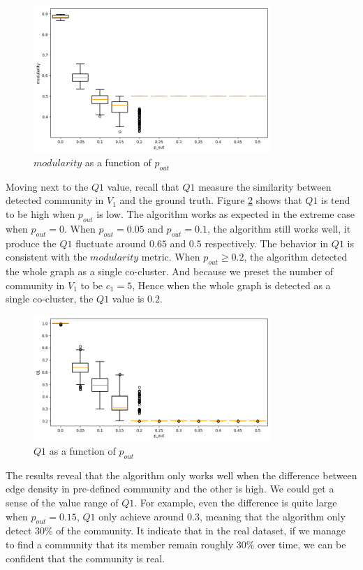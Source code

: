 \begin{figure}[H]
	\centering
	\includegraphics[width=0.8\textwidth]{images/modularity_pout.png}
	\caption{$modularity$ as a function of $p_{out}$ }
	\label{fig:modularity_pout}
\end{figure}

Moving next to the $Q1$ value, recall that $Q1$ measure the similarity between detected community in $V_1$ and the ground truth.
Figure \ref{fig:Q1_pout} shows that $Q1$ is tend to be high when $p_{out}$ is low.
The algorithm works as expected in the extreme case when $p_{out} = 0$.
When $p_{out} = 0.05$ and $p_{out} = 0.1$, the algorithm still works well, it produce the $Q1$ fluctuate around $0.65$ and $0.5$ respectively.
The behavior in $Q1$ is consistent with the $modularity$ metric.
When $p_{out} \ge 0.2$, the algorithm detected the whole graph as a single co-cluster.
And because we preset the number of community in $V_1$ to be $c_1=5$,
Hence when the whole graph is detected as a single co-cluster, the $Q1$ value is $0.2$.

\begin{figure}[H]
	\centering
	\includegraphics[width=0.8\textwidth]{images/Q1_pout.png}
	\caption{$Q1$ as a function of $p_{out}$ }
	\label{fig:Q1_pout}
\end{figure}

The results reveal that the algorithm only works well when the difference between edge density in pre-defined community and the other is high.
We could get a sense of the value range of $Q1$.
For example, even the difference is quite large when $p_{out}=0.15$,
$Q1$ only achieve around $0.3$, meaning that the algorithm only detect $30\%$ of the community.
It indicate that in the real dataset, if we manage to find a community that
its member remain roughly $30\%$ over time, we can be confident that the community is real.

